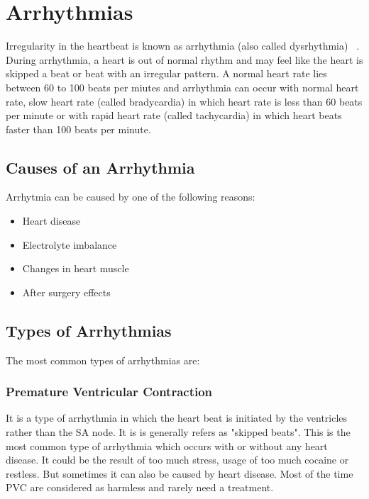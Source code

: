 \section{Arrhythmias}
Irregularity in the heartbeat is known as arrhythmia (also called dysrhythmia) ~\cite{medicinenet}. During arrhythmia, a heart is out of normal rhythm and may feel like the heart is skipped a beat or beat with an irregular pattern. A normal heart rate lies between 60 to 100 beats per miutes and arrhythmia can occur with normal heart rate,  slow heart rate (called bradycardia) in which heart rate 
is less than 60 beats per minute or with rapid heart rate (called tachycardia) in which heart beats faster than 100 beats
per minute.



\subsection{Causes of an Arrhythmia}
Arrhytmia can be caused by one of the following reasons:

\begin{itemize}
	\item Heart disease
	\item Electrolyte imbalance
	\item Changes in heart muscle
	\item After surgery effects
\end{itemize}

\subsection{Types of Arrhythmias}

The most common types of arrhythmias are:

\subsubsection{Premature Ventricular Contraction}
It is a type of arrhythmia in which the heart beat is initiated by the ventricles rather than the SA node. It is is generally refers as "skipped beats". This is the most common type of arrhythmia which occurs with or without any heart disease. It could be the result of too much stress, usage of too much cocaine or restless. But sometimes it can also be caused by heart disease. Most of the time PVC are considered as harmless and rarely need a treatment.

